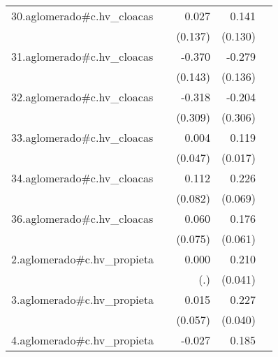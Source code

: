 {\begin{longtable}{l*{4}{D{.}{.}{-1}}}
\addlinespace
30.aglomerado#c.hv\_cloacas&                     &       0.027         &       0.141         &                     \\
            &                     &     (0.137)         &     (0.130)         &                     \\
\addlinespace
31.aglomerado#c.hv\_cloacas&                     &      -0.370\sym{**} &      -0.279\sym{*}  &                     \\
            &                     &     (0.143)         &     (0.136)         &                     \\
\addlinespace
32.aglomerado#c.hv\_cloacas&                     &      -0.318         &      -0.204         &                     \\
            &                     &     (0.309)         &     (0.306)         &                     \\
\addlinespace
33.aglomerado#c.hv\_cloacas&                     &       0.004         &       0.119\sym{***}&                     \\
            &                     &     (0.047)         &     (0.017)         &                     \\
\addlinespace
34.aglomerado#c.hv\_cloacas&                     &       0.112         &       0.226\sym{**} &                     \\
            &                     &     (0.082)         &     (0.069)         &                     \\
\addlinespace
36.aglomerado#c.hv\_cloacas&                     &       0.060         &       0.176\sym{**} &                     \\
            &                     &     (0.075)         &     (0.061)         &                     \\
\addlinespace
2.aglomerado#c.hv\_propieta&                     &       0.000         &       0.210\sym{***}&                     \\
            &                     &         (.)         &     (0.041)         &                     \\
\addlinespace
3.aglomerado#c.hv\_propieta&                     &       0.015         &       0.227\sym{***}&                     \\
            &                     &     (0.057)         &     (0.040)         &                     \\
\addlinespace
4.aglomerado#c.hv\_propieta&                     &      -0.027         &       0.185\sym{***}&                     \\

\end{longtable}}
